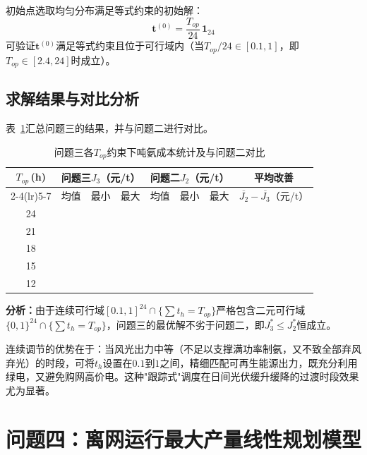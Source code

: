 \documentclass[UTF8,12pt,a4paper]{ctexart}
\newcommand{\blank}[1]{\underline{\makebox[#1][c]{}}}
\newcommand{\RES}{\blank{2cm}}          %
\begin{document}
初始点选取均匀分布满足等式约束的初始解：
\begin{equation}
  \mathbf{t}^{(0)} = \frac{T_{op}}{24}\,\mathbf{1}_{24}
  \label{eq:p3init}
\end{equation}
可验证$\mathbf{t}^{(0)}$满足等式约束且位于可行域内（当$T_{op}/24\in[0.1,1]$，即$T_{op}\in[2.4,24]$时成立）。

\subsection{求解结果与对比分析}

表~\ref{tab:p3_summary}汇总问题三的结果，并与问题二进行对比。

\begin{table}[htbp]
\centering
\caption{问题三各$T_{op}$约束下吨氨成本统计及与问题二对比}
\label{tab:p3_summary}
\small
\setlength{\tabcolsep}{4pt}
\begin{tabular}{c|ccc|ccc|c}
\toprule
\multirow{2}{*}{$T_{op}$\,(h)}
  & \multicolumn{3}{c|}{问题三$J_3$（元/t）}
  & \multicolumn{3}{c|}{问题二$J_2$（元/t）}
  & 平均改善 \\
\cmidrule(lr){2-4}\cmidrule(lr){5-7}
  & 均值 & 最小 & 最大 & 均值 & 最小 & 最大 & $\overline{J_2}-\overline{J_3}$（元/t）\\
\midrule
24 & \RES & \RES & \RES & \RES & \RES & \RES & \RES \\
21 & \RES & \RES & \RES & \RES & \RES & \RES & \RES \\
18 & \RES & \RES & \RES & \RES & \RES & \RES & \RES \\
15 & \RES & \RES & \RES & \RES & \RES & \RES & \RES \\
12 & \RES & \RES & \RES & \RES & \RES & \RES & \RES \\
\bottomrule
\end{tabular}
\end{table}

\noindent\textbf{分析：}由于连续可行域$[0.1,1]^{24}\cap\{\sum t_h=T_{op}\}$严格包含二元可行域$\{0,1\}^{24}\cap\{\sum t_h=T_{op}\}$，问题三的最优解不劣于问题二，即$J_3^*\leq J_2^*$恒成立。

连续调节的优势在于：当风光出力中等（不足以支撑满功率制氨，又不致全部弃风弃光）的时段，可将$t_h$设置在$0.1$到$1$之间，精细匹配可再生能源出力，既充分利用绿电，又避免购网高价电。这种"跟踪式"调度在日间光伏缓升缓降的过渡时段效果尤为显著。

\section{问题四：离网运行最大产量线性规划模型}
\end{document}

